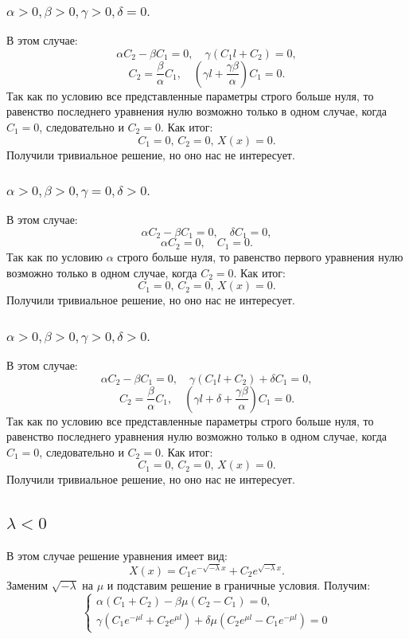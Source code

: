 \documentclass[12pt, a4paper]{article}
\begin{document}
\subsubsection{ $ \alpha > 0, \beta > 0, \gamma > 0, \delta = 0. $}
В этом случае:
\[ \alpha C_{2} - \beta C_{1} = 0, \quad \gamma (C_{1} l + C_{2}) = 0, \]
\[ C_{2} = \frac{\beta}{\alpha} C_{1}, \quad (\gamma l + \frac{\gamma \beta}{\alpha}) C_{1} = 0. \]
Так как по условию все представленные параметры строго больше нуля, то равенство последнего уравнения нулю возможно только в одном случае, когда $C_{1} = 0$, следовательно и $C_{2} = 0$. Как итог:
\[ C_{1} = 0, \, C_{2} = 0, \, X(x) = 0. \]
Получили тривиальное решение, но оно нас не интересует.

\subsubsection{ $ \alpha > 0, \beta > 0, \gamma = 0, \delta > 0. $}
В этом случае:
\[ \alpha C_{2} - \beta C_{1} = 0, \quad \delta C_{1} = 0, \]
\[ \alpha C_{2} = 0, \quad C_{1} = 0. \]
Так как по условию $\alpha$ строго больше нуля, то равенство первого уравнения нулю возможно только в одном случае, когда $C_{2} = 0$. Как итог:
\[ C_{1} = 0, \, C_{2} = 0, \, X(x) = 0. \]
Получили тривиальное решение, но оно нас не интересует.

\subsubsection{ $ \alpha > 0, \beta > 0, \gamma > 0, \delta > 0. $}
В этом случае:
\[ \alpha C_{2} - \beta C_{1} = 0, \quad \gamma (C_{1} l + C_{2}) + \delta C_{1} = 0, \]
\[ C_{2} = \frac{\beta}{\alpha} C_{1}, \quad (\gamma l + \delta + \frac{\gamma \beta}{\alpha}) C_{1} = 0. \]
Так как по условию все представленные параметры строго больше нуля, то равенство последнего уравнения нулю возможно только в одном случае, когда $C_{1} = 0$, следовательно и $C_{2} = 0$. Как итог:
\[ C_{1} = 0, \, C_{2} = 0, \, X(x) = 0. \]
Получили тривиальное решение, но оно нас не интересует.

\subsection{$\lambda < 0$}
В этом случае решение уравнения имеет вид:
\[ X(x) = C_{1} e^{-\sqrt{-\lambda}x} + C_{2} e^{\sqrt{-\lambda}x}. \]
Заменим $\sqrt{-\lambda}$ на $\mu$ и подставим решение в граничные условия. Получим:
\begin{displaymath}
	\begin{cases}
		\alpha (C_{1} + C_{2}) - \beta \mu (C_{2} - C_{1}) = 0, \\
		\gamma (C_{1} e^{-\mu l} + C_{2} e^{\mu l}) + \delta \mu (C_{2} e^{\mu l} - C_{1} e^{-\mu l}) = 0
	\end{cases}
\end{displaymath}
\end{document}
